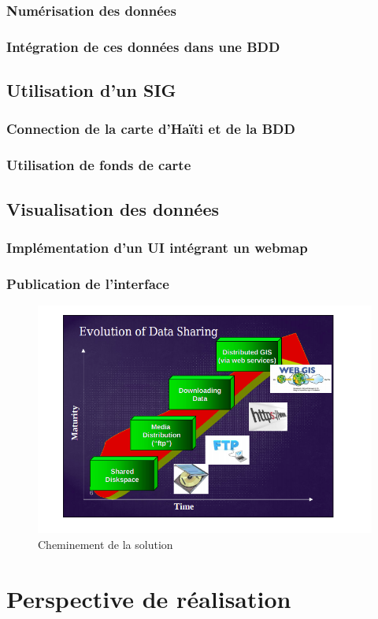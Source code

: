         \subsubsection{Numérisation des données}
            
        \subsubsection{Intégration de ces données dans une BDD}
            
    \subsection{Utilisation d'un SIG}
        \subsubsection{Connection de la carte d'Haïti et de la BDD}
            
        \subsubsection{Utilisation de fonds de carte}
            
    \subsection{Visualisation des données} 
        \subsubsection{Implémentation d'un UI intégrant un webmap}
            
        \subsubsection{Publication de l'interface}
            
    \begin{figure}[t]
        \centering
        \includegraphics[width=1\textwidth]{images/evolution_projetGIS.png}
        \caption{Cheminement de la solution}
    \end{figure}

\section{Perspective de réalisation}
    